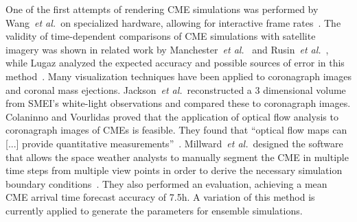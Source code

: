 \documentclass[journal]{vgtc}                %
\def\etal{\textit{et al.}}
\begin{document}
 One of the first attempts of rendering CME simulations was performed by Wang~\etal\ on specialized hardware, allowing for interactive frame rates~\cite{wang2004visualization}. The validity of time-dependent comparisons of CME simulations with satellite imagery was shown in related work by Manchester~\etal ~\cite{manchester2008three} and Rusin~\etal ~\cite{rusin2010comparing}, while Lugaz analyzed the expected accuracy and possible sources of error in this method~\cite{lugaz2010accuracy}. Many visualization techniques have been applied to coronagraph images and coronal mass ejections. Jackson~\etal\ reconstructed a 3 dimensional volume from SMEI's white-light observations and compared these to coronagraph images. Colaninno and Vourlidas proved that the application of optical flow analysis to coronagraph images of CMEs is feasible. They found that ``optical flow maps can [...] provide quantitative measurements''~\cite{Colaninno:2006ef}. Millward~\etal\ designed the software that allows the space weather analysts to manually segment the CME in multiple time steps from multiple view points in order to derive the necessary simulation boundary conditions~\cite{Millward:2013cm}. They also performed an evaluation, achieving a mean CME arrival time forecast accuracy of 7.5h. A variation of this method is currently applied to generate the parameters for ensemble simulations.



\end{document}
